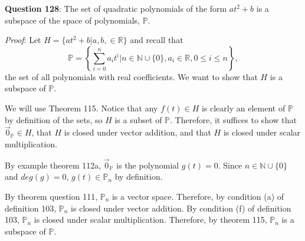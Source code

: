 \documentclass{exam}
\begin{document}

\textbf{Question 128}: The set of quadratic polynomials of the form $at^2+b$ is a subspace of the space of polynomials, $\mathbb{P}$.\newline
\vspace{0.2in}
\newline

\textit{Proof}: Let $H=\{at^2+b|a,b,\in\mathbb{R}\}$ and recall that $$\mathbb{P}=\left\{\sum_{i=0}^n a_it^i|n\in\mathbb{N}\cup\{0\},a_i\in\mathbb{R},0\leq i\leq n\right\},$$ the set of all polynomials with real coefficients. We want to show that $H$ is a subspace of $\mathbb{P}$.

We will use Theorem 115. Notice that any $f(t)\in H$ is clearly an element of $\mathbb{P}$ by definition of the sets, so $H$ is  a subset of $\mathbb{P}$. Therefore, it suffices to show that $\Vec{0}_{\mathbb{P}}\in H$, that $H$ is closed under vector addition, and that $H$ is closed under scalar multiplication. 

By example theorem 112a, $\Vec{0}_{\mathbb{P}}$ is the polynomial $g(t)=0$. Since $n\in\mathbb{N}\cup\{0\}$ and $deg(g)=0$, $g(t)\in\mathbb{P}_n$ by definition.

By theorem question 111, $\mathbb{P}_n$ is a vector space. Therefore, by condition (a) of definition 103, $\mathbb{P}_n$ is closed under vector addition. By condition (f) of definition 103, $\mathbb{P}_n$ is closed under scalar multiplication. Therefore, by theorem 115, $\mathbb{P}_n$ is a subspace of $\mathbb{P}$.
\end{document}
